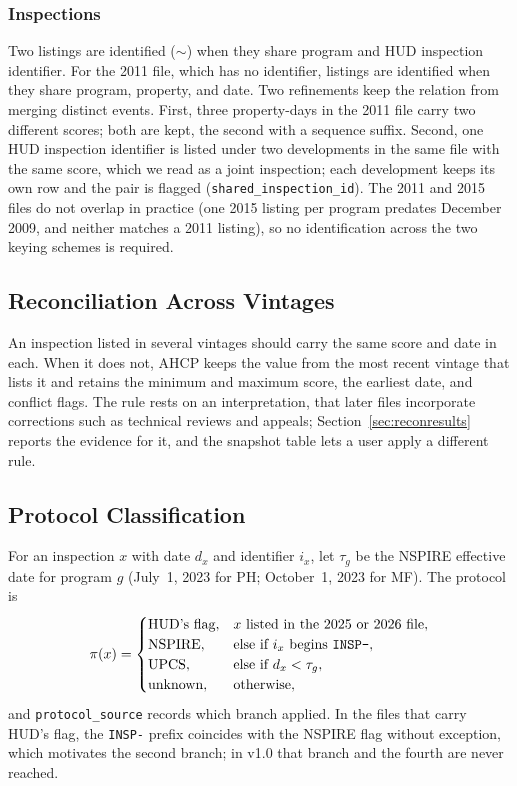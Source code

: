 \documentclass[10pt,twocolumn,letterpaper]{article}
\newcommand{\col}[1]{\texttt{\small #1}}
\begin{document}
\subsubsection{Inspections} Two listings are identified ($\sim$) when they share program and HUD inspection identifier. For the 2011 file, which has no identifier, listings are identified when they share program, property, and date. Two refinements keep the relation from merging distinct events. First, three property-days in the 2011 file carry two different scores; both are kept, the second with a sequence suffix. Second, one HUD inspection identifier is listed under two developments in the same file with the same score, which we read as a joint inspection; each development keeps its own row and the pair is flagged (\col{shared\_inspection\_id}). The 2011 and 2015 files do not overlap in practice (one 2015 listing per program predates December 2009, and neither matches a 2011 listing), so no identification across the two keying schemes is required.

\subsection{Reconciliation Across Vintages}\label{sec:reconcile}
An inspection listed in several vintages should carry the same score and date in each. When it does not, AHCP keeps the value from the most recent vintage that lists it and retains the minimum and maximum score, the earliest date, and conflict flags. The rule rests on an interpretation, that later files incorporate corrections such as technical reviews and appeals; Section~\ref{sec:reconresults} reports the evidence for it, and the snapshot table lets a user apply a different rule.

\subsection{Protocol Classification}
For an inspection $x$ with date $d_x$ and identifier $i_x$, let $\tau_g$ be the NSPIRE effective date for program $g$ (July~1, 2023 for PH; October~1, 2023 for MF). The protocol is
\begin{equation}
\pi(x)=\begin{cases}
\text{HUD's flag}, & x \text{ listed in the 2025 or 2026 file},\\
\text{NSPIRE}, & \text{else if } i_x \text{ begins \texttt{INSP-}},\\
\text{UPCS}, & \text{else if } d_x<\tau_g,\\
\text{unknown}, & \text{otherwise},
\end{cases}
\end{equation}
and \col{protocol\_source} records which branch applied. In the files that carry HUD's flag, the \col{INSP-} prefix coincides with the NSPIRE flag without exception, which motivates the second branch; in v1.0 that branch and the fourth are never reached.
\end{document}
